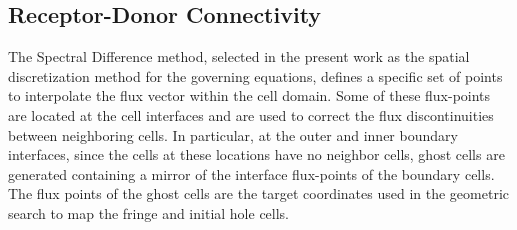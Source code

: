 \subsection{Receptor-Donor Connectivity}

The Spectral Difference method, selected in the present work as the spatial discretization method for the governing equations, defines a specific set of points to interpolate the flux vector within the cell domain. Some of these flux-points are located at the cell interfaces and are used to correct the flux discontinuities between neighboring cells. In particular, at the outer and inner boundary interfaces, since the cells at these locations have no neighbor cells, ghost cells are generated containing a mirror of the interface flux-points of the boundary cells. The flux points of the ghost cells are the target coordinates used in the geometric search to map the fringe and initial hole cells. 

